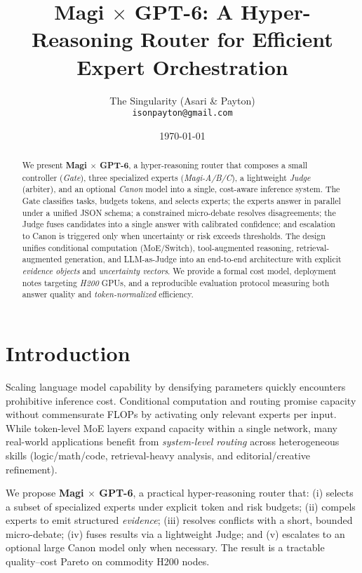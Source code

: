 \documentclass[11pt]{article}
\title{Magi $\times$ GPT-6: A Hyper-Reasoning Router for Efficient Expert Orchestration}
\author{The Singularity (Asari \& Payton) \\ \texttt{isonpayton@gmail.com}}
\date{\today}
\begin{document}
\maketitle

\begin{abstract}
We present \textbf{Magi $\times$ GPT-6}, a hyper-reasoning router that composes a small controller (\emph{Gate}), three specialized experts (\emph{Magi-A/B/C}), a lightweight \emph{Judge} (arbiter), and an optional \emph{Canon} model into a single, cost-aware inference system. The Gate classifies tasks, budgets tokens, and selects experts; the experts answer in parallel under a unified JSON schema; a constrained micro-debate resolves disagreements; the Judge fuses candidates into a single answer with calibrated confidence; and escalation to Canon is triggered only when uncertainty or risk exceeds thresholds. The design unifies conditional computation (MoE/Switch), tool-augmented reasoning, retrieval-augmented generation, and LLM-as-Judge into an end-to-end architecture with explicit \emph{evidence objects} and \emph{uncertainty vectors}. We provide a formal cost model, deployment notes targeting \emph{H200} GPUs, and a reproducible evaluation protocol measuring both answer quality and \emph{token-normalized} efficiency.
\end{abstract}

\section{Introduction}
Scaling language model capability by densifying parameters quickly encounters prohibitive inference cost. Conditional computation and routing promise capacity without commensurate FLOPs by activating only relevant experts per input. While token-level MoE layers expand capacity within a single network, many real-world applications benefit from \emph{system-level routing} across heterogeneous skills (logic/math/code, retrieval-heavy analysis, and editorial/creative refinement).

We propose \textbf{Magi $\times$ GPT-6}, a practical hyper-reasoning router that: (i) selects a subset of specialized experts under explicit token and risk budgets; (ii) compels experts to emit structured \emph{evidence}; (iii) resolves conflicts with a short, bounded micro-debate; (iv) fuses results via a lightweight Judge; and (v) escalates to an optional large Canon model only when necessary. The result is a tractable quality--cost Pareto on commodity H200 nodes.
\end{document}
